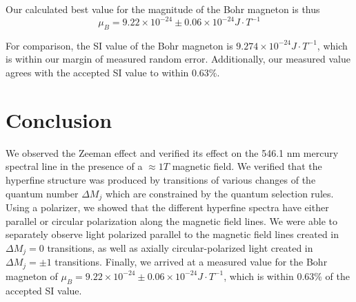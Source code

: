 \documentclass[twocolumn]{article}
\begin{document}
		Our calculated best value for the magnitude of the Bohr magneton is thus 
		\begin{equation}
			\mu_B = 9.22\times10^{-24}\pm 0.06\times10^{-24} J\cdot T^{-1}
		\end{equation}
		
		For comparison, the SI value of the Bohr magneton is $9.274\times10^{-24} J\cdot T^{-1}$\cite{_codata_????}, which is within our margin of measured random error.
		Additionally, our measured value agrees with the accepted SI value to within 0.63\%.
		

\section{Conclusion} \label{sec:Conclusion}
	We observed the Zeeman  effect and verified its effect on the 546.1 nm mercury spectral line in the presence of a $\approx1T$ magnetic field.
	We verified that the hyperfine structure was produced by transitions of various changes of the quantum number $\Delta M_j$ which are constrained by the quantum selection rules.
	Using a polarizer, we showed that the different hyperfine spectra have either parallel or circular polarization along the magnetic field lines.
	We were able to separately observe light polarized parallel to the magnetic field lines created in $\Delta M_j = 0$ transitions, as well as axially circular-polarized light created in $\Delta M_j = \pm1$ transitions.
	Finally, we arrived at a measured value for the Bohr magneton of $\mu_B = 9.22\times10^{-24}\pm 0.06\times10^{-24} J\cdot T^{-1}$, which is within 0.63\% of the accepted SI value.


\end{document}
